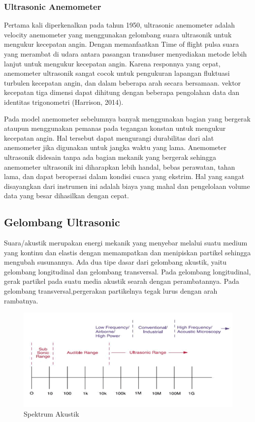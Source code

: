 \subsubsection{Ultrasonic Anemometer}

Pertama kali diperkenalkan pada tahun 1950, ultrasonic anemometer adalah velocity anemometer yang menggunakan gelombang suara ultrasonik 
untuk mengukur kecepatan angin. Dengan memanfaatkan Time of flight pulsa suara yang merambat di udara antara pasangan transduser menyediakan metode lebih lanjut untuk mengukur kecepatan angin. 
Karena responnya yang cepat, anemometer ultrasonik sangat 
cocok untuk pengukuran lapangan fluktuasi turbulen kecepatan angin, dan dalam beberapa arah secara bersamaan. vektor kecepatan tiga dimensi dapat 
dihitung dengan beberapa pengolahan data dan identitas trigonometri (Harrison, 2014).

Pada model anemometer sebelumnya banyak menggunakan bagian yang bergerak ataupun menggunakan pemanas pada tegangan konstan untuk mengukur kecepatan angin. Hal tersebut dapat mengurangi durabilitas
dari alat anemometer jika digunakan untuk jangka waktu yang lama.
Anemometer ultrasonik didesain tanpa ada bagian mekanik yang bergerak sehingga anemometer ultrasonik ini 
diharapkan lebih handal, bebas perawatan, tahan lama, dan dapat beroperasi dalam kondisi cuaca yang ekstrim. 
Hal yang sangat disayangkan dari instrumen ini adalah biaya yang mahal dan pengelolaan volume data yang besar dihasilkan dengan cepat. 

\subsection{Gelombang Ultrasonic}
Suara/akustik merupakan energi mekanik yang menyebar melalui suatu medium yang kontinu dan elastis dengan memampatkan dan menipiskan partikel 
sehingga mengubah susunannya. Ada dua tipe dasar dari gelombang akustik, yaitu gelombang longitudinal dan gelombang transversal. Pada gelombang 
longitudinal, gerak partikel pada suatu media akustik searah dengan perambatannya. Pada gelombang transversal,pergerakan partikelnya tegak lurus dengan arah rambatnya.

\begin{figure}[h!]
	\centering
	\includegraphics[width=\linewidth]{"gambar/spektrum akustik"}
	\caption{Spektrum Akustik \parencite{figGelombangAkustik}}
	\label{fig:spektrum-akustik}
\end{figure}

